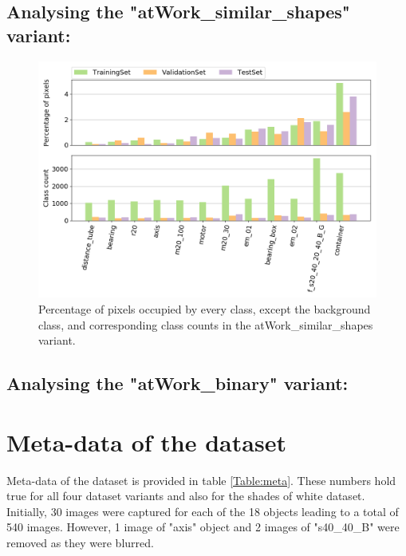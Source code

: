 	\subsection{Analysing the "atWork\_similar\_shapes" variant:}
		
		\begin{figure}[!htb]
		\centering
			\includegraphics[scale=0.5]{images/shape_noB}
			\caption{Percentage of pixels occupied by every class, except the background class, and corresponding class counts in the atWork\_similar\_shapes variant.}
			\label{Fig:ana_shape}
		\end{figure}
		
	\subsection{Analysing the "atWork\_binary" variant:}
	

\newpage
\section{Meta-data of the dataset}

Meta-data of the dataset is provided in table \ref{Table:meta}. These numbers hold true for all four dataset variants and also for the shades of white dataset. Initially, 30 images were captured for each of the 18 objects leading to a total of 540 images. However, 1 image of "axis" object and 2 images of "s40\_40\_B" were removed as they were blurred.


